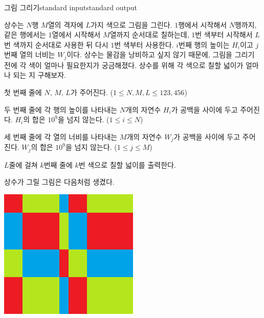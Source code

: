 \begin{problem}{그림 그리기}{standard input}{standard output}

상수는 $N$행 $M$열의 격자에 $L$가지 색으로 그림을 그린다. $1$행에서 시작해서 $N$행까지, 같은 행에서는 $1$열에서 시작해서 $M$열까지 순서대로 칠하는데, $1$번 색부터 시작해서 $L$번 색까지 순서대로 사용한 뒤 다시 $1$번 색부터 사용한다. $i$번째 행의 높이는 $H_i$이고 $j$번째 열의 너비는 $W_j$이다. 상수는 물감을 낭비하고 싶지 않기 때문에, 그림을 그리기 전에 각 색이 얼마나 필요한지가 궁금해졌다. 상수를 위해 각 색으로 칠할 넓이가 얼마나 되는 지 구해보자.

\InputFile
첫 번째 줄에 $N$, $M$, $L$가 주어진다. ($1 \le N, M, L \le 123,456$)

두 번째 줄에 각 행의 높이를 나타내는 $N$개의 자연수 $H_i$가 공백을 사이에 두고 주어진다. $H_i$의 합은 $10^9$을 넘지 않는다. ($1 \le i \le N$)

세 번째 줄에 각 열의 너비를 나타내는 $M$개의 자연수 $W_j$가 공백을 사이에 두고 주어진다. $W_j$의 합은 $10^9$을 넘지 않는다. ($1 \le j \le M$)

\OutputFile
$L$줄에 걸쳐 $k$번째 줄에 $k$번 색으로 칠할 넓이를 출력한다.

\Example

\begin{example}
%
\end{example}

\Notes

상수가 그릴 그림은 다음처럼 생겼다.

\begin{center}
  \includegraphics[width=0.5\textwidth]{picture.png}
\end{center}

\end{problem}
